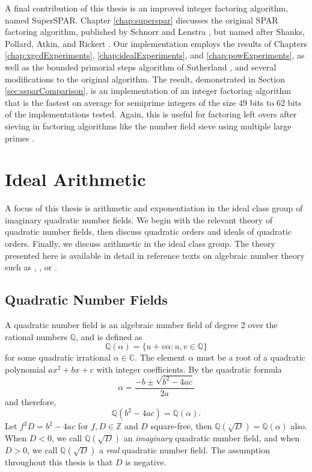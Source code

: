 \documentclass{ucalgthes1}
\theoremstyle{definition}
\newcommand{\CC}{\mathbb{C}}
\newcommand{\ZZ}{\mathbb{Z}}
\newcommand{\QQ}{\mathbb{Q}}
\begin{document}
A final contribution of this thesis is an improved integer factoring algorithm, named \mbox{SuperSPAR}.  Chapter \ref{chap:superspar} discusses the original SPAR factoring algorithm, published by Schnorr and Lenstra \cite{Schnorr1984}, but named after Shanks, Pollard, Atkin, and Rickert \cite[p.484]{Lenstra1992}.  Our implementation employs the results of Chapters \ref{chap:xgcdExperiments}, \ref{chap:idealExperiments}, and \ref{chap:powExperiments}, as well as the bounded primorial steps algorithm of Sutherland \cite{Sutherland2007}, and several modifications to the original algorithm.  The result, demonstrated in Section \ref{sec:ssparComparison}, is an implementation of an integer factoring algorithm that is the fastest on average for semiprime integers of the size 49 bits to 62 bits of the implementations tested.  Again, this is useful for factoring left overs after sieving in factoring algorithms like the number field sieve using multiple large primes \cite[\S 6.1.4]{Crandall2001}.


\chapter{Ideal Arithmetic}
\label{chap:idealArithmetic}


A focus of this thesis is arithmetic and exponentiation in the ideal class group of imaginary quadratic number fields.  We begin with the relevant theory of quadratic number fields, then discuss quadratic orders and ideals of quadratic orders.  Finally, we discuss arithmetic in the ideal class group.  The theory presented here is available in detail in reference texts on algebraic number theory such as \cite{Cohn1980}, \cite{Hua2012}, or \cite{Ireland1990}. 


\section{Quadratic Number Fields}

A quadratic number field is an algebraic number field of degree 2 over the rational numbers $\QQ$, and is defined as
\[
	\QQ(\alpha) = \{u + v\alpha : u,v \in \QQ\}
\]
for some quadratic irrational $\alpha \in \CC$.  The element $\alpha$ must be a root of a quadratic polynomial $ax^2 + bx + c$ with integer coefficients.  By the quadratic formula
\[
	\alpha = \frac{-b \pm \sqrt{b^2 - 4ac}}{2a}
\]
and therefore,
\[
	\QQ(b^2-4ac) = \QQ(\alpha).
\]
Let $f^2 D = b^2-4ac$ for $f, D \in \ZZ$ and $D$ square-free, then $\QQ(\sqrt D) = \QQ(\alpha)$ also.  When $D < 0$, we call $\QQ(\sqrt D)$ an \emph{imaginary} quadratic number field, and when $D > 0$, we call $\QQ(\sqrt D)$ a \emph{real} quadratic number field.  The assumption throughout this thesis is that $D$ is negative.
\end{document}

